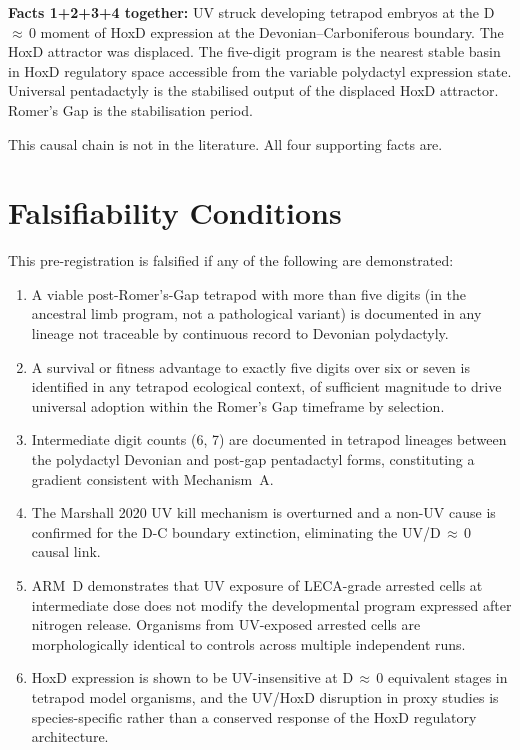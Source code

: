\documentclass[11pt, a4paper]{article}
\begin{document}
\textbf{Facts 1+2+3+4 together:}
UV struck developing tetrapod embryos at the
D\,$\approx$\,0 moment of HoxD expression at the
Devonian--Carboniferous boundary.
The HoxD attractor was displaced.
The five-digit program is the nearest stable
basin in HoxD regulatory space accessible from
the variable polydactyl expression state.
Universal pentadactyly is the stabilised output
of the displaced HoxD attractor.
Romer's Gap is the stabilisation period.

This causal chain is not in the literature.
All four supporting facts are.

\section{Falsifiability Conditions}

This pre-registration is falsified if any of the
following are demonstrated:

\begin{enumerate}[leftmargin=*, label=\textbf{F\arabic*:}]
\item A viable post-Romer's-Gap tetrapod with
  more than five digits (in the ancestral limb
  program, not a pathological variant) is
  documented in any lineage not traceable by
  continuous record to Devonian polydactyly.

\item A survival or fitness advantage to exactly
  five digits over six or seven is identified in
  any tetrapod ecological context, of sufficient
  magnitude to drive universal adoption within
  the Romer's Gap timeframe by selection.

\item Intermediate digit counts (6, 7) are
  documented in tetrapod lineages between the
  polydactyl Devonian and post-gap pentadactyl
  forms, constituting a gradient consistent with
  Mechanism~A.

\item The Marshall 2020 UV kill mechanism is
  overturned and a non-UV cause is confirmed
  for the D-C boundary extinction, eliminating
  the UV/D\,$\approx$\,0 causal link.

\item ARM~D demonstrates that UV exposure of
  LECA-grade arrested cells at intermediate dose
  does not modify the developmental program
  expressed after nitrogen release. Organisms
  from UV-exposed arrested cells are morphologically
  identical to controls across multiple independent
  runs.

\item HoxD expression is shown to be UV-insensitive
  at D\,$\approx$\,0 equivalent stages in tetrapod
  model organisms, and the UV/HoxD disruption in
  proxy studies is species-specific rather than
  a conserved response of the HoxD regulatory
  architecture.
\end{enumerate}
\end{document}
